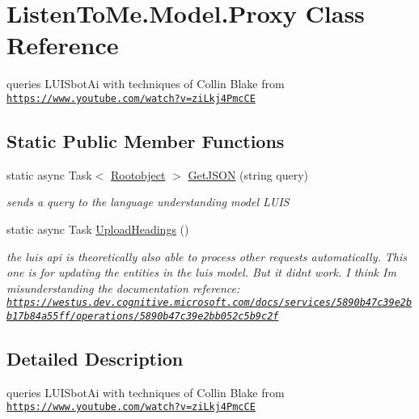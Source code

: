 \hypertarget{class_listen_to_me_1_1_model_1_1_proxy}{}\section{Listen\+To\+Me.\+Model.\+Proxy Class Reference}
\label{class_listen_to_me_1_1_model_1_1_proxy}


queries L\+U\+I\+Sbot\+Ai with techniques of Collin Blake from \href{https://www.youtube.com/watch?v=ziLkj4PmcCE}{\tt https\+://www.\+youtube.\+com/watch?v=zi\+Lkj4\+Pmc\+CE}  


\subsection*{Static Public Member Functions}
\begin{DoxyCompactItemize}
\item 
static async Task$<$ \hyperlink{class_listen_to_me_1_1_model_1_1_rootobject}{Rootobject} $>$ \hyperlink{class_listen_to_me_1_1_model_1_1_proxy_a5207b409f3a97f2450e9dce1108a6da1}{Get\+J\+S\+ON} (string query)
\begin{DoxyCompactList}\small\item\em sends a query to the language understanding model L\+U\+IS \end{DoxyCompactList}\item 
static async Task \hyperlink{class_listen_to_me_1_1_model_1_1_proxy_a6e03af261e464fb9b5a25e99b5209c32}{Upload\+Headings} ()
\begin{DoxyCompactList}\small\item\em the luis api is theoretically also able to process other requests automatically. This one is for updating the entities in the luis model. But it didn\textquotesingle{}t work. I think I\textquotesingle{}m misunderstanding the documentation reference\+: \href{https://westus.dev.cognitive.microsoft.com/docs/services/5890b47c39e2bb17b84a55ff/operations/5890b47c39e2bb052c5b9c2f}{\tt https\+://westus.\+dev.\+cognitive.\+microsoft.\+com/docs/services/5890b47c39e2bb17b84a55ff/operations/5890b47c39e2bb052c5b9c2f} \end{DoxyCompactList}\end{DoxyCompactItemize}


\subsection{Detailed Description}
queries L\+U\+I\+Sbot\+Ai with techniques of Collin Blake from \href{https://www.youtube.com/watch?v=ziLkj4PmcCE}{\tt https\+://www.\+youtube.\+com/watch?v=zi\+Lkj4\+Pmc\+CE} 



